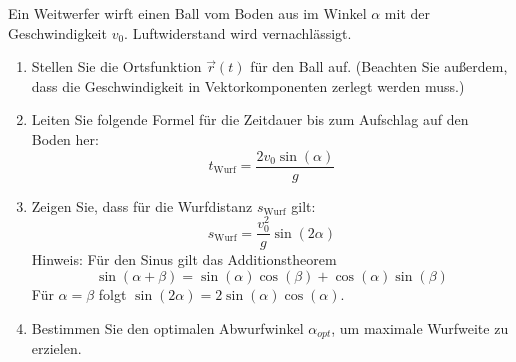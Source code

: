 \begin{ExerciseBlock}
Ein Weitwerfer wirft einen Ball vom Boden aus im Winkel $\alpha$ mit der Geschwindigkeit $v_0$. Luftwiderstand wird vernachlässigt.

\begin{enumerate}
	\item Stellen Sie die Ortsfunktion $\vec{r}(t)$ für den Ball auf. (Beachten Sie außerdem, dass die Geschwindigkeit in Vektorkomponenten
zerlegt werden muss.)

	\item Leiten Sie folgende Formel für die Zeitdauer bis zum Aufschlag auf den Boden her: \[ t_\text{Wurf} = \frac{2 v_0 \sin(\alpha)}{g} \]

	\item Zeigen Sie, dass für die Wurfdistanz $s_\text{Wurf}$ gilt: \[ s_\text{Wurf} = \frac{v_0^2}{g} \sin(2\alpha) \]
	Hinweis: Für den Sinus gilt das Additionstheorem \[ \sin(\alpha+\beta) = \sin(\alpha) \cos(\beta) + \cos(\alpha) \sin(\beta) \]
	Für $\alpha = \beta$ folgt $\sin(2 \alpha) = 2 \sin(\alpha) \cos(\alpha)$.

	\item Bestimmen Sie den optimalen Abwurfwinkel $\alpha_{opt}$, um maximale Wurfweite zu erzielen.

\end{enumerate}
\end{ExerciseBlock}
